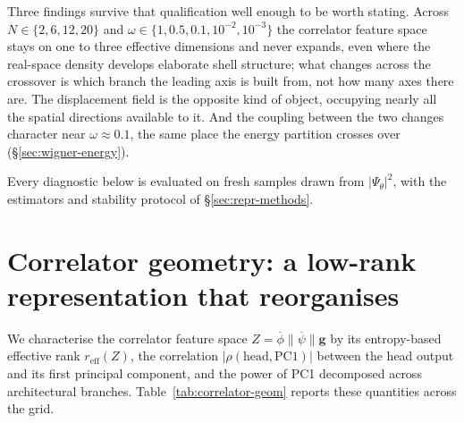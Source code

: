 Three findings survive that qualification well enough to be worth stating. Across
$N\in\{2,6,12,20\}$ and $\omega\in\{1,0.5,0.1,10^{-2},10^{-3}\}$ the correlator feature
space stays on one to three effective dimensions and never expands, even where the
real-space density develops elaborate shell structure; what changes across the crossover is
which branch the leading axis is built from, not how many axes there are. The displacement
field is the opposite kind of object, occupying nearly all the spatial directions available
to it. And the coupling between the two changes character near $\omega\approx0.1$, the same
place the energy partition crosses over (\S\ref{sec:wigner-energy}).

Every diagnostic below is evaluated on fresh samples drawn from $|\Psi_\theta|^2$, with the
estimators and stability protocol of \S\ref{sec:repr-methods}.

\section{Correlator geometry: a low-rank representation that reorganises}
\label{sec:repr-geom}

We characterise the correlator feature space $Z = \overline\phi\|\overline\psi\|\mathbf{g}$
by its entropy-based effective rank $r_{\mathrm{eff}}(Z)$, the correlation
$|\rho(\mathrm{head},\mathrm{PC1})|$ between the head output and its first principal component,
and the power of PC1 decomposed across architectural branches.
Table~\ref{tab:correlator-geom} reports these quantities across the grid.


